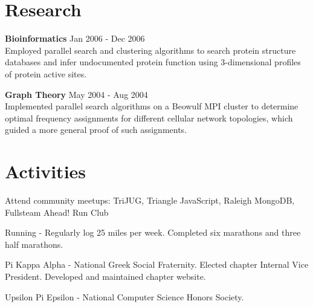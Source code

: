 \documentclass[margin,line]{resume}
\begin{document}
\begin{resume}
  \section{\mysidestyle \textcolor{mySideColor}{Research}}

  \textbf{Bioinformatics} \hfill Jan 2006 - Dec 2006 \vspace{2mm}\\
  Employed parallel search and clustering algorithms to search protein
  structure databases and infer undocumented protein function using
  3-dimensional profiles of protein active sites.

  \textbf{Graph Theory} \hfill May 2004 - Aug 2004 \vspace{2mm}\\
  Implemented parallel search algorithms on a Beowulf MPI cluster to
  determine optimal frequency assignments for different cellular
  network topologies, which guided a more general proof of such
  assignments.



  \section{\mysidestyle \textcolor{mySideColor}{Activities}}

  Attend community meetups: TriJUG, Triangle JavaScript, Raleigh MongoDB,
  Fullsteam Ahead! Run Club

  Running - Regularly log 25 miles per week. Completed six marathons
  and three half marathons.\vspace{-2mm}

  Pi Kappa Alpha - National Greek Social Fraternity. Elected chapter
  Internal Vice President. Developed and maintained chapter
  website.\vspace{-2mm}

  Upsilon Pi Epsilon - National Computer Science Honors
  Society.\vspace{-2mm}

\end{resume}
\end{document}
